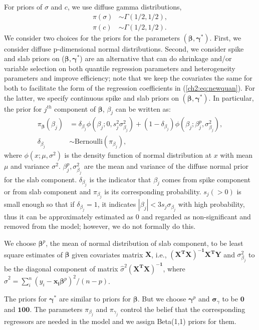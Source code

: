 \documentclass[12pt]{article}
\begin{document}
For priors of $\sigma$ and $c$, we use diffuse gamma distributions,
\begin{align*}
  \pi(\sigma) & \sim \Gamma (1/2, 1/2), \\
  \pi(c) & \sim \Gamma(1/2, 1/2).
\end{align*}
We consider two choices for the priors for the parameters
$(\bm{\beta}, \bm{\gamma}^{*})$.  First, we consider diffuse p-dimensional
normal distributions.  Second, we consider spike and slab priors on
($\bm \beta, \bm \gamma^{*}$) are an alternative that can do shrinkage
and/or variable selection on both quantile regression parameters and
heterogeneity parameters and improve efficiency; note that we keep the
covariates the same for both to facilitate the form of the regression
coefficients in (\ref{ch2:eq:newquan}).  For the latter, we specify
continuous spike and slab priors \citep{george1993}
on $(\bm \beta, \bm \gamma^{*})$.
In particular, the prior for $j^{th}$ component of $\bm \beta$, $\beta_j$ can be written as:
\begin{align*}
  \pi_{\bm \beta} (\beta_j) &= \delta_{\beta_j} \phi(\beta_j; 0, s_j^2
  \sigma_{\beta_j}^2) +
  (1- \delta_{\beta_j}) \phi(\beta_j; \beta_j^p, \sigma_{\beta_j}^2),\\
  \delta_{\beta_j} & \sim \mbox{Bernoulli} (\pi_{\beta_j}),
\end{align*}
where $\phi(x; \mu, \sigma^2)$ is the density function of normal
distribution at $x$ with mean $\mu$ and variance
$\sigma^2$. $\beta_j^p, \sigma_{\beta_j}^2$ are the mean and variance
of the diffuse normal prior for the slab component.
$\delta_{\beta_j}$ is the indicator that $\beta_j$ comes from spike
component or from slab component and $\pi_{\beta_j}$ is its corresponding
probability.  $s_j (>0)$ is small enough so that if $\delta_{\beta_j}
= 1$, it indicates $|\beta_j | < 3 s_j\sigma_{\beta_j}$ with high
probability, thus it can be approximately estimated as 0 and regarded
as non-significant and removed from the model; however, we do not formally do this.

We choose $\bm \beta^p$, the mean of normal distribution of slab
component, to be least square estimates of $\bm \beta$ given covariates
matrix $\bm X$, i.e., $\bm{(X^TX)^{-1}X^TY}$ and
$\sigma_{\beta_j}^2$ to be the diagonal component of matrix
$\hat{\sigma}^2 \bm{(X^TX)^{-1}}$, where $\hat{\sigma}^2 = \sum_i^n
(y_i - \bm{x_i\beta}^p)^2/(n - p)$.

The priors for $\bm \gamma^{*}$ are similar to priors for $\bm \beta$.
But we choose $\bm \gamma^p$ and $\bm \sigma_{\gamma}$ to be $\bm 0$ and $\bm{100}$.
The parameters $\pi_{\beta_j}$ and $\pi_{\gamma_j}$ control the belief that the corresponding regressors are needed in the model and we assign Beta(1,1) priors for them.
\end{document}
